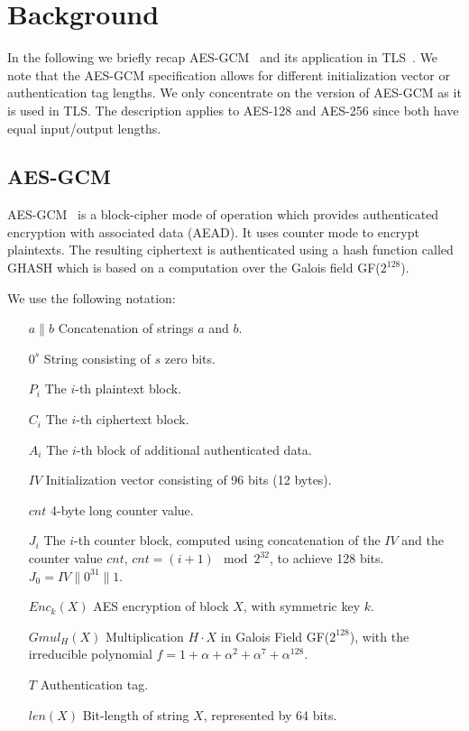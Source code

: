 \section{Background}
In the following we briefly recap AES-GCM~\cite{gcm,gcm-nist} and its application in TLS~\cite{rfc5246}. We note that the AES-GCM
specification allows for different initialization vector or authentication tag lengths.
We only concentrate on the version of AES-GCM as it is used in TLS.
The description applies to AES-128 and AES-256 since both have equal input/output lengths.

\subsection{AES-GCM}
AES-GCM~\cite{gcm-nist} is a block-cipher mode of operation which provides authenticated encryption with associated data (AEAD). It uses counter mode to encrypt plaintexts. The resulting ciphertext is authenticated using a
hash function called GHASH which is based on a computation over the Galois field GF($2^{128}$).

We use the following notation:
\begin{itemize}[leftmargin=1.8cm]
	\item[$a \parallel b$] Concatenation of strings $a$ and $b$.
	\item[$0^s$] String consisting of $s$ zero bits.
	\item[$P_i$] The $i$-th plaintext block.
	\item[$C_i$] The $i$-th ciphertext block.
	\item[$A_i$] The $i$-th block of additional authenticated data.
	\item[$IV$] Initialization vector consisting of 96 bits (12 bytes).
	\item[$cnt$] 4-byte long counter value.
	\item[$J_i$] The $i$-th counter block, computed using concatenation of the $IV$ and the counter value $cnt$, $cnt = (i+1) \mod{2^{32}}$, to achieve 128 bits. $J_0 = IV \parallel 0 ^{31} \parallel 1$.
	\item[$Enc_k(X)$] AES encryption of block $X$, with symmetric key $k$.
	\item[$Gmul_H(X)$] Multiplication $H \cdot X$ in Galois Field GF($2^{128}$), with the irreducible polynomial $f = 1 + \alpha + \alpha^2 + \alpha^7 + \alpha^{128}$.
	\item[$T$] Authentication tag.
	\item[$len(X)$] Bit-length of string $X$, represented by 64 bits.
\end{itemize}

